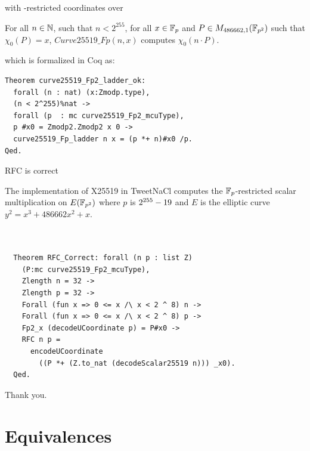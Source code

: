 \documentclass[8pt,aspectratio=169]{beamer}
\begin{document}
%
%
\begin{frame}[fragile]{with -restricted coordinates over }
\begin{theorem}
  \label{thm:general-scalarmult}
  For all $n \in \mathbb{N}$, such that $n < 2^{255}$,
  for all $x \in \mathbb{F}_{p}$ and $P \in M_{486662,1}(\mathbb{F}_{p^2})$ such that $\chi_0(P) = x$,
  $Curve25519\_Fp(n,x)$ computes $\chi_0(n \cdot P)$.
\end{theorem}
which is formalized in Coq as:
\begin{lstlisting}[language=Coq, basicstyle=\normalsize]
Theorem curve25519_Fp2_ladder_ok:
  forall (n : nat) (x:Zmodp.type),
  (n < 2^255)%nat ->
  forall (p  : mc curve25519_Fp2_mcuType),
  p #x0 = Zmodp2.Zmodp2 x 0 ->
  curve25519_Fp_ladder n x = (p *+ n)#x0 /p.
Qed.
\end{lstlisting}

\end{frame}


%
%
\begin{frame}[fragile]{RFC is correct}
  \begin{informaltheorem}
  The implementation of X25519 in TweetNaCl computes the
  $\mathbb{F}_{p}$-restricted \xcoord scalar multiplication on $E(\mathbb{F}_{p^2})$ where $p$ is $2^{255}-19$
  and $E$ is the elliptic curve $y^2 = x^3 + 486662 x^2 + x$.
  \end{informaltheorem}

  \begin{lstlisting}[language=Coq, basicstyle=\normalsize]


  Theorem RFC_Correct: forall (n p : list Z)
    (P:mc curve25519_Fp2_mcuType),
    Zlength n = 32 ->
    Zlength p = 32 ->
    Forall (fun x => 0 <= x /\ x < 2 ^ 8) n ->
    Forall (fun x => 0 <= x /\ x < 2 ^ 8) p ->
    Fp2_x (decodeUCoordinate p) = P#x0 ->
    RFC n p =
      encodeUCoordinate
        ((P *+ (Z.to_nat (decodeScalar25519 n))) _x0).
  Qed.
  \end{lstlisting}
\end{frame}

%
%
\begin{frame}[standout]
	\Huge Thank you.
\end{frame}


\appendix

\section{Equivalences}
\end{document}
